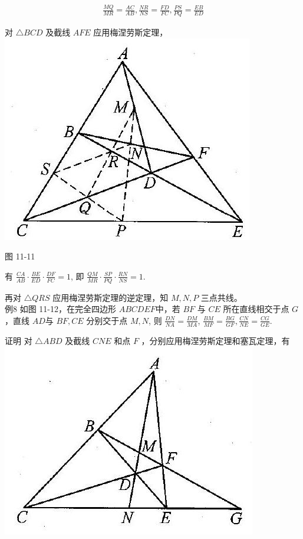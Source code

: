 \documentclass[10pt]{article}
\begin{document}
\begin{align*}
\frac{M Q}{M R}=\frac{A C}{A B}, \frac{N R}{N S}=\frac{F D}{F C}, \frac{P S}{P Q}=\frac{E B}{E D}
\end{align*}

对 $\triangle B C D$ 及截线 $A F E$ 应用梅涅劳斯定理，\\
\includegraphics[max width=\textwidth, center]{2024_10_30_2c8f45efd4a519b08e1ag-107}

图 11-11

有 $\frac{C A}{A B} \cdot \frac{B E}{E D} \cdot \frac{D F}{F C}=1$, 即 $\frac{Q M}{M R} \cdot \frac{S P}{P Q} \cdot \frac{R N}{N S}=1$.

再对 $\triangle Q R S$ 应用梅涅劳斯定理的逆定理，知 $M, N, P$ 三点共线。\\
例8 如图 11-12，在完全四边形 $A B C D E F$中，若 $B F$ 与 $C E$ 所在直线相交于点 $G$ ，直线 $A D$与 $B F, C E$ 分别交于点 $M, N$, 则 $\frac{D N}{N A}=\frac{D M}{M A}$, $\frac{B M}{M F}=\frac{B G}{G F}, \frac{C N}{N E}=\frac{C G}{G E}$.

证明 对 $\triangle A B D$ 及截线 $C N E$ 和点 $F$ ，分别应用梅涅劳斯定理和塞瓦定理，有\\
\includegraphics[max width=\textwidth, center]{2024_10_30_2c8f45efd4a519b08e1ag-107(1)}
\end{document}
